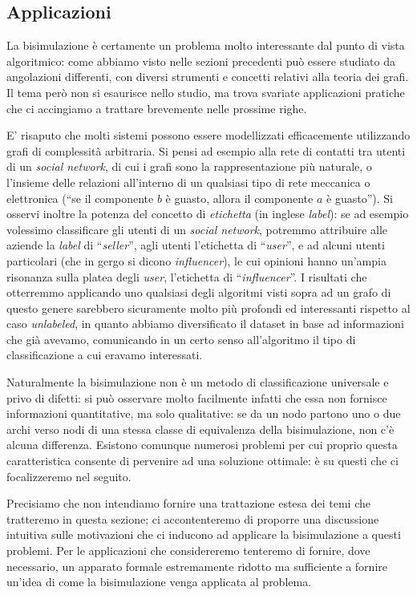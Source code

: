 \subsection{Applicazioni}
\label{sec:applitations}
La bisimulazione è certamente un problema molto interessante dal punto di vista algoritmico: come abbiamo visto nelle sezioni precedenti può essere studiato da angolazioni differenti, con diversi strumenti e concetti relativi alla teoria dei grafi. Il tema però non si esaurisce nello studio, ma trova svariate applicazioni pratiche che ci accingiamo a trattare brevemente nelle prossime righe.

E' risaputo che molti sistemi possono essere modellizzati efficacemente utilizzando grafi di complessità arbitraria. Si pensi ad esempio alla rete di contatti tra utenti di un \emph{social network}, di cui i grafi sono la rappresentazione più naturale, o l'insieme delle relazioni all'interno di un qualsiasi tipo di rete meccanica o elettronica (``se il componente $b$ è guasto, allora il componente $a$ è guasto''). Si osservi inoltre la potenza del concetto di \emph{etichetta} (in inglese \emph{label}): se ad esempio volessimo classificare gli utenti di un \emph{social network}, potremmo attribuire alle aziende la \emph{label} di ``\emph{seller}'', agli utenti l'etichetta di ``\emph{user}'', e ad alcuni utenti particolari (che in gergo si dicono \emph{influencer}), le cui opinioni hanno un'ampia risonanza sulla platea degli \emph{user}, l'etichetta di ``\emph{influencer}''. I risultati che otterremmo applicando uno qualsiasi degli algoritmi visti sopra ad un grafo di questo genere sarebbero sicuramente molto più profondi ed interessanti rispetto al caso \emph{unlabeled}, in quanto abbiamo diversificato il dataset in base ad informazioni che già avevamo, comunicando in un certo senso all'algoritmo il tipo di classificazione a cui eravamo interessati.

Naturalmente la bisimulazione non è un metodo di classificazione universale e privo di difetti: si può osservare molto facilmente infatti che essa non fornisce informazioni quantitative, ma solo qualitative: se da un nodo partono uno o due archi verso nodi di una stessa classe di equivalenza della bisimulazione, non c'è alcuna differenza. Esistono comunque numerosi problemi per cui proprio questa caratteristica consente di pervenire ad una soluzione ottimale: è su questi che ci focalizzeremo nel seguito.

Precisiamo che non intendiamo fornire una trattazione estesa dei temi che tratteremo in questa sezione; ci accontenteremo di proporre una discussione intuitiva sulle motivazioni che ci inducono ad applicare la bisimulazione a questi problemi. Per le applicazioni che considereremo tenteremo di fornire, dove necessario, un apparato formale estremamente ridotto ma sufficiente a fornire un'idea di come  la bisimulazione venga applicata al problema.

